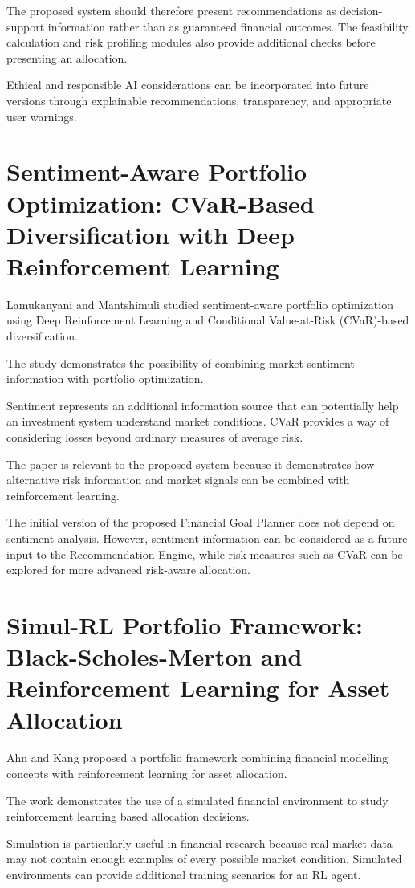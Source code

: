 The proposed system should therefore present recommendations as decision-support information rather than as guaranteed financial outcomes. The feasibility calculation and risk profiling modules also provide additional checks before presenting an allocation.

Ethical and responsible AI considerations can be incorporated into future versions through explainable recommendations, transparency, and appropriate user warnings.

\section{Sentiment-Aware Portfolio Optimization: CVaR-Based Diversification with Deep Reinforcement Learning}
Lamukanyani and Mantshimuli studied sentiment-aware portfolio optimization using Deep Reinforcement Learning and Conditional Value-at-Risk (CVaR)-based diversification.

The study demonstrates the possibility of combining market sentiment information with portfolio optimization.

Sentiment represents an additional information source that can potentially help an investment system understand market conditions. CVaR provides a way of considering losses beyond ordinary measures of average risk.

The paper is relevant to the proposed system because it demonstrates how alternative risk information and market signals can be combined with reinforcement learning.

The initial version of the proposed Financial Goal Planner does not depend on sentiment analysis. However, sentiment information can be considered as a future input to the Recommendation Engine, while risk measures such as CVaR can be explored for more advanced risk-aware allocation.

\section{Simul-RL Portfolio Framework: Black-Scholes-Merton and Reinforcement Learning for Asset Allocation}
Ahn and Kang proposed a portfolio framework combining financial modelling concepts with reinforcement learning for asset allocation.

The work demonstrates the use of a simulated financial environment to study reinforcement learning based allocation decisions.

Simulation is particularly useful in financial research because real market data may not contain enough examples of every possible market condition. Simulated environments can provide additional training scenarios for an RL agent.

